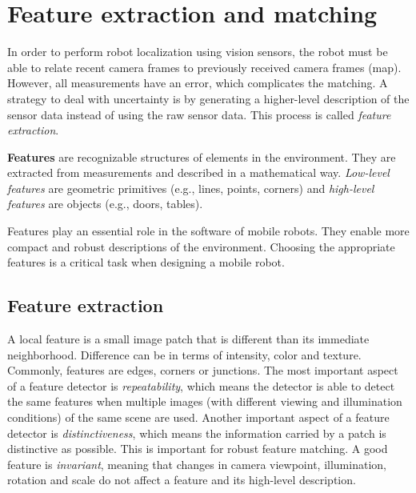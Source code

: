 \section{Feature extraction and matching}
\label{sec:computer-vision-feature-extraction-matching}
In order to perform robot localization using vision sensors, the robot must be able to relate recent camera frames to previously received camera frames (map).
However, all measurements have an error, which complicates the matching.
A strategy to deal with uncertainty is by generating a higher-level description of the sensor data instead of using the raw sensor data.
This process is called \textit{feature extraction}.

\begin{mydef}
\textbf{Features} are recognizable structures of elements in the environment.
They are extracted from measurements and described in a mathematical way.
\textit{Low-level features} are geometric primitives (e.g., lines, points, corners) and \textit{high-level features} are objects (e.g., doors, tables).
\end{mydef}

Features play an essential role %
in the software of mobile robots.
They enable more compact and robust descriptions of the environment.
Choosing the appropriate features is a critical task when designing a mobile robot.

\subsection{Feature extraction}
\label{sec:background-feature-extraction}
A local feature is a small image patch that is different than its immediate neighborhood.
Difference can be in terms of intensity, color and texture.
Commonly, features are edges, corners or junctions.
The most important aspect of a feature detector is \textit{repeatability}, which means the detector is able to detect the same features when multiple images (with different viewing and illumination conditions) of the same scene are used.
Another important aspect of a feature detector is \textit{distinctiveness}, which means the information carried by a patch is distinctive as possible.
This is important for robust feature matching.
A good feature is \textit{invariant}, meaning that changes in camera viewpoint, illumination, rotation and scale do not affect a feature and its high-level description.

